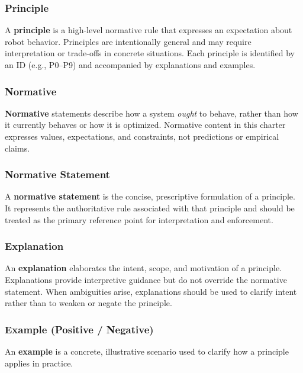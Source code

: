 \documentclass[utf8]{frontiers_suppmat} %
\begin{document}
\subsubsection{Principle}\label{principle}

A \textbf{principle} is a high-level normative rule that expresses an
expectation about robot behavior. Principles are intentionally general
and may require interpretation or trade-offs in concrete situations.
Each principle is identified by an ID (e.g., P0--P9) and accompanied by
explanations and examples.

\subsubsection{Normative}\label{normative}

\textbf{Normative} statements describe how a system \emph{ought} to
behave, rather than how it currently behaves or how it is optimized.
Normative content in this charter expresses values, expectations, and
constraints, not predictions or empirical claims.

\subsubsection{Normative Statement}\label{normative-statement-10}

A \textbf{normative statement} is the concise, prescriptive formulation
of a principle. It represents the authoritative rule associated with
that principle and should be treated as the primary reference point for
interpretation and enforcement.

\subsubsection{Explanation}\label{explanation-4}

An \textbf{explanation} elaborates the intent, scope, and motivation of
a principle. Explanations provide interpretive guidance but do not
override the normative statement. When ambiguities arise, explanations
should be used to clarify intent rather than to weaken or negate the
principle.

\subsubsection{Example (Positive /
Negative)}\label{example-positive-negative}

An \textbf{example} is a concrete, illustrative scenario used to clarify
how a principle applies in practice.
\end{document}
